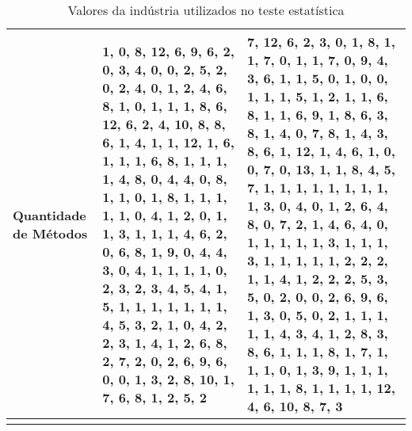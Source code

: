 \begin{longtable}{| p{2cm} | p{6.5cm} | p{6.5cm} | }
				\hline
				
		Quantidade de Métodos &	
		1, 0, 8, 12, 6, 9, 6, 2, 0, 3, 4, 0, 0, 2, 5, 2, 0, 2, 4, 0, 1, 2, 4, 6, 8, 1, 0, 1, 1, 1, 8, 6, 12, 6, 2, 4, 10, 8, 8, 6, 1, 4, 1, 1, 12, 1, 6, 1, 1, 1, 6, 8, 1, 1, 1, 1, 4, 8, 0, 4, 4, 0, 8, 1, 1, 0, 1, 8, 1, 1, 1, 1, 1, 0, 4, 1, 2, 0, 1, 1, 3, 1, 1, 1, 4, 6, 2, 0, 6, 8, 1, 9, 0, 4, 4, 3, 0, 4, 1, 1, 1, 1, 0, 2, 3, 2, 3, 4, 5, 4, 1, 5, 1, 1, 1, 1, 1, 1, 1, 4, 5, 3, 2, 1, 0, 4, 2, 2, 3, 1, 4, 1, 2, 6, 8, 2, 7, 2, 0, 2, 6, 9, 6, 0, 0, 1, 3, 2, 8, 10, 1, 7, 6, 8, 1, 2, 5, 2 &	
		
		7, 12, 6, 2, 3, 0, 1, 8, 1, 1, 7, 0, 1, 1, 7, 0, 9, 4, 3, 6, 1, 1, 5, 0, 1, 0, 0, 1, 1, 1, 5, 1, 2, 1, 1, 6, 8, 1, 1, 6, 9, 1, 8, 6, 3, 8, 1, 4, 0, 7, 8, 1, 4, 3, 8, 6, 1, 12, 1, 4, 6, 1, 0, 0, 7, 0, 13, 1, 1, 8, 4, 5, 7, 1, 1, 1, 1, 1, 1, 1, 1, 1, 3, 0, 4, 0, 1, 2, 6, 4, 8, 0, 7, 2, 1, 4, 6, 4, 0, 1, 1, 1, 1, 1, 3, 1, 1, 1, 3, 1, 1, 1, 1, 1, 2, 2, 2, 1, 1, 4, 1, 2, 2, 2, 5, 3, 5, 0, 2, 0, 0, 2, 6, 9, 6, 1, 3, 0, 5, 0, 2, 1, 1, 1, 1, 1, 4, 3, 4, 1, 2, 8, 3, 8, 6, 1, 1, 1, 8, 1, 7, 1, 1, 1, 0, 1, 3, 9, 1, 1, 1, 1, 1, 1, 8, 1, 1, 1, 1, 12, 4, 6, 10, 8, 7, 3
		\\
		
		\hline
	\caption{Valores da indústria utilizados no teste estatística}
	\label{tab:valores-industria}
\end{longtable}
